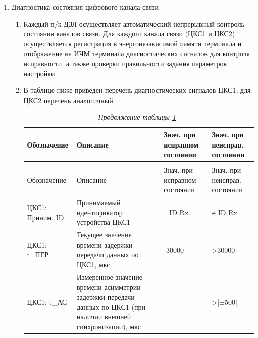 \begin{enumerate}
\item Диагностика состояния цифрового канала связи
\begin{enumerate}
\item Каждый п/к ДЗЛ осуществляет автоматический непрерывный контроль состояния каналов связи. Для каждого канала связи (ЦКС1 и ЦКС2) осуществляется регистрация в энергонезависимой памяти терминала и отображение на ИЧМ терминала диагностических сигналов для контроля исправности, а также проверки правильности задания параметров настройки.
\item В таблице ниже приведен перечень диагностических сигналов ЦКС1, для ЦКС2 перечень аналогичный.
  \begingroup
  \small
  \setlength{\extrarowheight}{0.06cm}
  \begin{longtable}{|>{\centering\arraybackslash}m{4cm}|>{\centering\arraybackslash}m{6.4cm}|>{\centering\arraybackslash}m{2.8cm}|>{\centering\arraybackslash}m{2.8cm}|}
    \caption{Перечень диагностических сигналов ЦКС1\hfill\vspace{-0.5\baselineskip}}\label{desc_dzl:tbl10}\\
    \hline
    \rowcolor{gray!30} Обозначение & Описание & Знач. при исправном состоянии & Знач. при неисправ. состоянии \\
    \hline
    \endfirsthead
    \caption*{\hspace{3pt}\emph{Продолжение таблицы \ref{desc_dzl:tbl10}}\hfill\ }\vspace{-0.5\baselineskip} \\
    \hline
    \rowcolor{gray!30} Обозначение & Описание & Знач. при исправном состоянии & Знач. при неисправ. состоянии \\
    \hline
    \endhead
    \centering\arraybackslash ЦКС1: Приним. ID  & \centering\arraybackslash Принимаемый идентификатор устройства ЦКС1 & \centering\arraybackslash =ID Rx & \centering\arraybackslash ≠ ID Rx \\
    \hline
    \centering\arraybackslash ЦКС1: t\_ПЕР  & \centering\arraybackslash Текущее значение времени задержки передачи данных по ЦКС1, мкс & \centering\arraybackslash 0-30000 & \centering\arraybackslash >30000 \\
    \hline
    \centering\arraybackslash ЦКС1: t\_АС  & \centering\arraybackslash Измеренное значение времени асимметрии задержки передачи данных по ЦКС1 (при наличии внешней синхронизации), мкс & \centering\arraybackslash 0 & \centering\arraybackslash >|±500| \\

\end{longtable}
\end{enumerate}
\end{enumerate}
